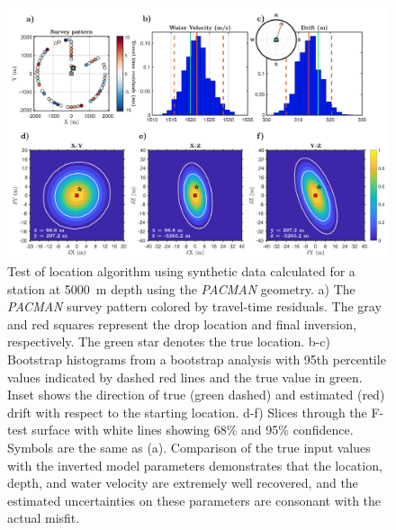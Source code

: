 \begin{figure}[h]
\includegraphics[trim=0cm 0cm 0cm 0cm,clip=true,width=\columnwidth]{Figure01.pdf}
\caption{Test of location algorithm using synthetic data calculated for a station at 5000~m depth using the \textit{PACMAN} geometry. a) The \textit{PACMAN} survey pattern colored by travel-time residuals. The gray and red squares represent the drop location and final inversion, respectively. The green star denotes the true location. b-c) Bootstrap histograms from a bootstrap analysis with 95th percentile values indicated by dashed red lines and the true value in green. Inset shows the direction of true (green dashed) and estimated (red) drift with respect to the starting location. d-f) Slices through the F-test surface with white lines showing 68\% and 95\% confidence. Symbols are the same as (a). Comparison of the true input values with the inverted model parameters demonstrates that the location, depth, and water velocity are extremely well recovered, and the estimated uncertainties on these parameters are consonant with the actual misfit.}
\label{fig:one_sta_synth}
\end{figure}

\newpage

